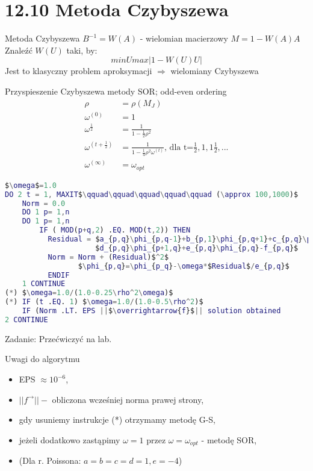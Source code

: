 \section{12.10 Metoda Czybyszewa}

\begin{frame}{Metoda Czybyszewa}
  $B^{-1}=W(A)$ - wielomian macierzowy $M=1-W(A)A$ Znaleźć $W(U)$ taki, by:
  $$minUmax|1-W(U)U|$$
  Jest to klasyczny problem aproksymacji $\Rightarrow$ wielomiany Czybyszewa
\end{frame}

\begin{frame}
  \begin{block}{Przyspieszenie Czybyszewa metody SOR; odd-even ordering}
    \begin{align*}
    \rho &= \rho(M_J)\\
    \omega^{(0)}&=1\\
    \omega^{\frac{1}{2}}&=\frac{1}{1-\frac{1}{2}\rho^2}\\
    \omega^{(t+\frac{1}{2})}&=\frac{1}{1-\frac{1}{4}\rho^2\omega^{(t)}}\text{, dla t=}\frac{1}{2},1,1\frac{1}{2},...\\
    \omega^{(\infty)} &= \omega_{opt}
    \end{align*}
  \end{block}
\end{frame}

\begin{frame}[fragile]{}
\begin{lstlisting}[language=Matlab, mathescape]
$\omega$=1.0
DO 2 t = 1, MAXIT$\qquad\qquad\qquad\qquad\qquad (\approx 100,1000)$
    Norm = 0.0
    DO 1 p= 1,n
    DO 1 p= 1,n
        IF ( MOD(p+q,2) .EQ. MOD(t,2)) THEN
          Residual = $a_{p,q}\phi_{p,q-1}+b_{p,1}\phi_{p,q+1}+c_{p,q}\phi_{p-1,q}+$
                     $d_{p,q}\phi_{p+1,q}+e_{p,q}\phi_{p,q}-f_{p,q}$
          Norm = Norm + (Residual)$^2$
                 $\phi_{p,q}=\phi_{p_q}-\omega*$Residual$/e_{p,q}$
          ENDIF
    1 CONTINUE
(*) $\omega=1.0/(1.0-0.25\rho^2\omega)$
(*) IF (t .EQ. 1) $\omega=1.0/(1.0-0.5\rho^2)$
    IF (Norm .LT. EPS ||$\overrightarrow{f}$|| solution obtained
2 CONTINUE
\end{lstlisting}
  \hfill\hfill Zadanie: Przećwiczyć na lab.
\end{frame}

\begin{frame}{}
  \begin{block}{Uwagi do algorytmu}
    \begin{itemize}
      \item EPS $\approx 10^{-6}$,
      \item $||f^\rightarrow|| -$ obliczona wcześniej norma prawej strony,
      \item gdy usuniemy instrukcje (*) otrzymamy metodę G-S,
      \item jeżeli dodatkowo zastąpimy $\omega=1$ przez $\omega=\omega_{opt}$ - metodę SOR,
      \item (Dla r. Poissona: $a=b=c=d=1, e=-4$)
    \end{itemize}
  \end{block}
\end{frame}

